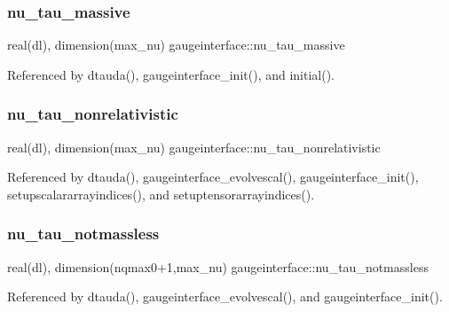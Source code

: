 \subsubsection{\texorpdfstring{nu\+\_\+tau\+\_\+massive}{nu\_tau\_massive}}
{\footnotesize\ttfamily real(dl), dimension(max\+\_\+nu) gaugeinterface\+::nu\+\_\+tau\+\_\+massive}



Referenced by dtauda(), gaugeinterface\+\_\+init(), and initial().

\mbox{\label{namespacegaugeinterface_aa6ec574b0c9183eb8881d0ed0376740c}} 
\subsubsection{\texorpdfstring{nu\+\_\+tau\+\_\+nonrelativistic}{nu\_tau\_nonrelativistic}}
{\footnotesize\ttfamily real(dl), dimension(max\+\_\+nu) gaugeinterface\+::nu\+\_\+tau\+\_\+nonrelativistic}



Referenced by dtauda(), gaugeinterface\+\_\+evolvescal(), gaugeinterface\+\_\+init(), setupscalararrayindices(), and setuptensorarrayindices().

\mbox{\label{namespacegaugeinterface_a041cc4df547c2fb25f42679b34de4891}} 
\subsubsection{\texorpdfstring{nu\+\_\+tau\+\_\+notmassless}{nu\_tau\_notmassless}}
{\footnotesize\ttfamily real(dl), dimension(nqmax0+1,max\+\_\+nu) gaugeinterface\+::nu\+\_\+tau\+\_\+notmassless}



Referenced by dtauda(), gaugeinterface\+\_\+evolvescal(), and gaugeinterface\+\_\+init().

\mbox{\label{namespacegaugeinterface_a6e217a5a543d2b9517624820de0e3338}} 

